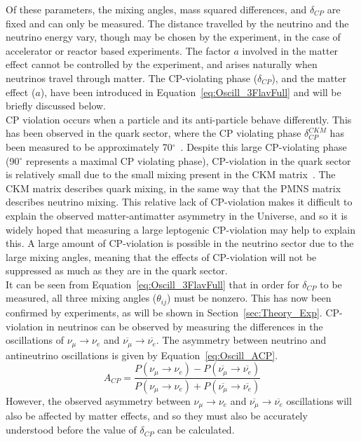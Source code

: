 Of these parameters, the mixing angles, mass squared differences, and $\delta_{CP}$ are fixed and can only be measured. The distance travelled by the neutrino and the neutrino energy vary, though may be chosen by the experiment, in the case of accelerator or reactor based experiments. The factor $a$ involved in the matter effect cannot be controlled by the experiment, and arises naturally when neutrinos travel through matter. The CP-violating phase ($\delta_{CP}$), and the matter effect ($a$), have been introduced in Equation~\ref{eq:Oscill_3FlavFull} and will be briefly discussed below. \\

CP violation occurs when a particle and its anti-particle behave differently. This has been observed in the quark sector, where the CP violating phase $\delta^{CKM}_{CP}$ has been measured to be approximately 70$^{\circ}$~\citep{PDGReview}. Despite this large CP-violating phase (90$^{\circ}$ represents a maximal CP violating phase), CP-violation in the quark sector is relatively small due to the small mixing present in the CKM matrix~\citep{PhysRevLett.10.531, Kobayashi:1973fv}. The CKM matrix describes quark mixing, in the same way that the PMNS matrix describes neutrino mixing. This relative lack of CP-violation makes it difficult to explain the observed matter-antimatter asymmetry in the Universe, and so it is widely hoped that measuring a large leptogenic CP-violation may help to explain this. A large amount of CP-violation is possible in the neutrino sector due to the large mixing angles, meaning that the effects of CP-violation will not be suppressed as much as they are in the quark sector. \\ 

It can be seen from Equation~\ref{eq:Oscill_3FlavFull} that in order for $\delta_{CP}$ to be measured, all three mixing angles ($\theta_{ij}$) must be nonzero. This has now been confirmed by experiments, as will be shown in Section~\ref{sec:Theory_Exp}. CP-violation in neutrinos can be observed by measuring the differences in the oscillations of $\nu_{\mu}\rightarrow\nu_{e}$ and $\overline{\nu_{\mu}}\rightarrow\overline{\nu_{e}}$. The asymmetry between neutrino and antineutrino oscillations is given by Equation~\ref{eq:Oscill_ACP}.
\begin{equation}
  \label{eq:Oscill_ACP}
  A_{CP} = \frac{ P(\nu_{\mu}\rightarrow\nu_{e}) - P(\overline{\nu_{\mu}}\rightarrow\overline{\nu_{e}}) } { P(\nu_{\mu}\rightarrow\nu_{e}) + P(\overline{\nu_{\mu}}\rightarrow\overline{\nu_{e}}) }
\end{equation}
However, the observed asymmetry between $\nu_{\mu}\rightarrow\nu_{e}$ and $\overline{\nu_{\mu}}\rightarrow\overline{\nu_{e}}$ oscillations will also be affected by matter effects, and so they must also be accurately understood before the value of $\delta_{CP}$ can be calculated. \\

